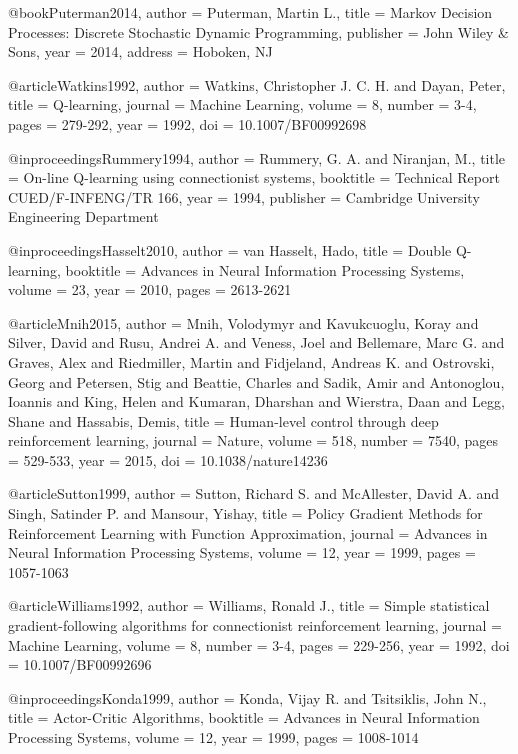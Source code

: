 @book{Puterman2014,
  author = {Puterman, Martin L.},
  title = {Markov Decision Processes: Discrete Stochastic Dynamic Programming},
  publisher = {John Wiley \& Sons},
  year = {2014},
  address = {Hoboken, NJ}
}

@article{Watkins1992,
  author = {Watkins, Christopher J. C. H. and Dayan, Peter},
  title = {Q-learning},
  journal = {Machine Learning},
  volume = {8},
  number = {3-4},
  pages = {279-292},
  year = {1992},
  doi = {10.1007/BF00992698}
}

@inproceedings{Rummery1994,
  author = {Rummery, G. A. and Niranjan, M.},
  title = {On-line Q-learning using connectionist systems},
  booktitle = {Technical Report CUED/F-INFENG/TR 166},
  year = {1994},
  publisher = {Cambridge University Engineering Department}
}

@inproceedings{Hasselt2010,
  author = {van Hasselt, Hado},
  title = {Double Q-learning},
  booktitle = {Advances in Neural Information Processing Systems},
  volume = {23},
  year = {2010},
  pages = {2613-2621}
}

@article{Mnih2015,
  author = {Mnih, Volodymyr and Kavukcuoglu, Koray and Silver, David and Rusu, Andrei A. and Veness, Joel and Bellemare, Marc G. and Graves, Alex and Riedmiller, Martin and Fidjeland, Andreas K. and Ostrovski, Georg and Petersen, Stig and Beattie, Charles and Sadik, Amir and Antonoglou, Ioannis and King, Helen and Kumaran, Dharshan and Wierstra, Daan and Legg, Shane and Hassabis, Demis},
  title = {Human-level control through deep reinforcement learning},
  journal = {Nature},
  volume = {518},
  number = {7540},
  pages = {529-533},
  year = {2015},
  doi = {10.1038/nature14236}
}

@article{Sutton1999,
  author = {Sutton, Richard S. and McAllester, David A. and Singh, Satinder P. and Mansour, Yishay},
  title = {Policy Gradient Methods for Reinforcement Learning with Function Approximation},
  journal = {Advances in Neural Information Processing Systems},
  volume = {12},
  year = {1999},
  pages = {1057-1063}
}

@article{Williams1992,
  author = {Williams, Ronald J.},
  title = {Simple statistical gradient-following algorithms for connectionist reinforcement learning},
  journal = {Machine Learning},
  volume = {8},
  number = {3-4},
  pages = {229-256},
  year = {1992},
  doi = {10.1007/BF00992696}
}

@inproceedings{Konda1999,
  author = {Konda, Vijay R. and Tsitsiklis, John N.},
  title = {Actor-Critic Algorithms},
  booktitle = {Advances in Neural Information Processing Systems},
  volume = {12},
  year = {1999},
  pages = {1008-1014}
}

